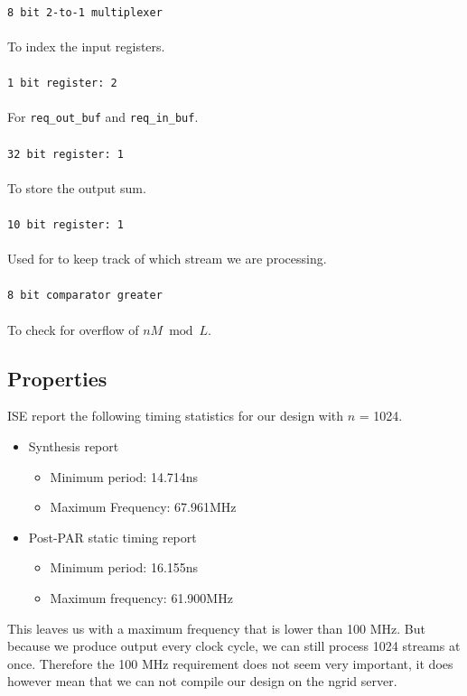 \\
\texttt{8 bit 2-to-1 multiplexer}\\
\\
To index the input registers.\\
\\
\texttt{1 bit register: 2}\\
\\
For \texttt{req\_out\_buf} and \texttt{req\_in\_buf}.\\
\\
\texttt{32 bit register: 1}\\
\\
To store the output sum.\\
\\
\texttt{10 bit register: 1}\\
\\
Used for to keep track of which stream we are processing.\\
\\
\texttt{8 bit comparator greater}\\
\\
To check for overflow of $nM \bmod L$.
\subsection{Properties}
ISE report the following timing statistics for our design with $n$ = 1024. 
\begin{itemize}
\item
Synthesis report
\begin{itemize}
\item Minimum period: 14.714ns
\item Maximum Frequency: 67.961MHz
\end{itemize}
\item
Post-PAR static timing report
\begin{itemize}
\item  Minimum period:   16.155ns  
\item Maximum frequency: 61.900MHz
\end{itemize}
\end{itemize}
 This leaves us with a maximum frequency that is lower than 100 MHz. But because we produce output every clock cycle, we can still process 1024 streams at once. Therefore the 100 MHz requirement does not seem very important, it does however mean that we can not compile our design on the ngrid server. 
